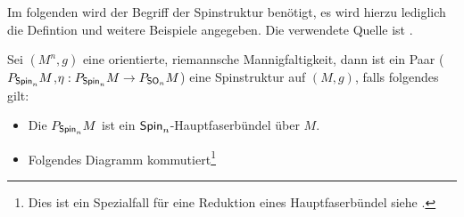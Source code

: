 Im folgenden wird der Begriff der Spinstruktur benötigt, es wird
hierzu lediglich die Defintion und weitere Beispiele angegeben.  Die
verwendete Quelle ist \cite{BHMMM15}.   
\begin{Def}[Spinstruktur]\label{DefSpin}
  Sei $(M^n,g)$ eine orientierte, riemannsche Mannigfaltigkeit, dann ist ein Paar
  ($P_{\operatorname{\mathsf{Spin}}_n}M$,$\eta : P_{\operatorname{\mathsf{Spin}}_n}M \rightarrow
  P_{\operatorname{\mathsf{SO}}_n}M$) eine Spinstruktur auf $(M,g)$, falls folgendes gilt:
	 \begin{itemize}
         \item Die \mfg $P_{\operatorname{\mathsf{Spin}}_n}M$ ist ein
           $\operatorname{\mathsf{Spin}}_n$-Hauptfaserbündel über $ M $.
         \item Folgendes Diagramm kommutiert\footnote{Dies ist ein Spezialfall für eine Reduktion eines Hauptfaserbündel siehe \cite{baum09}.}\\

           \begin{center}
           \end{center}


\end{itemize}
\end{Def}
